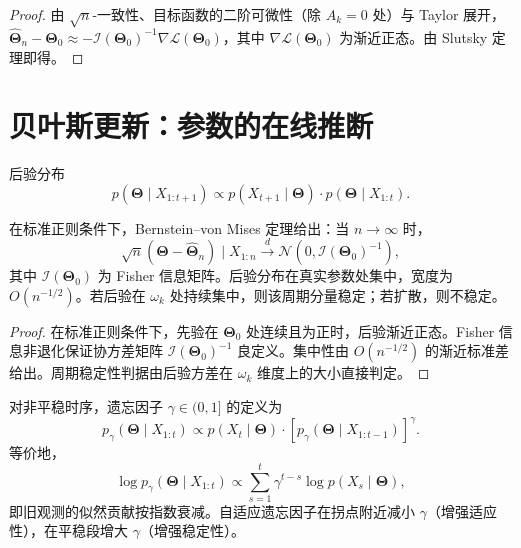 \begin{proof}
由 $\sqrt{n}$-一致性、目标函数的二阶可微性（除 $A_k=0$ 处）与 Taylor 展开，$\hat{\boldsymbol{\Theta}}_n-\boldsymbol{\Theta}_0\approx-\mathcal{I}(\boldsymbol{\Theta}_0)^{-1}\nabla\mathcal{L}(\boldsymbol{\Theta}_0)$，其中 $\nabla\mathcal{L}(\boldsymbol{\Theta}_0)$ 为渐近正态。由 Slutsky 定理即得。
\end{proof}

\section{贝叶斯更新：参数的在线推断}

\begin{definition}[有限谐波参数的贝叶斯更新]\label{def:ts_bayesian_update}
后验分布
\[
p(\boldsymbol{\Theta} \mid X_{1:t+1}) \propto p(X_{t+1} \mid \boldsymbol{\Theta}) \cdot p(\boldsymbol{\Theta} \mid X_{1:t}).
\]
\end{definition}

\begin{proposition}[后验收敛性与周期稳定性]\label{prop:ts_bayes_convergence}
在标准正则条件下，Bernstein--von Mises 定理给出：当 $n \to \infty$ 时，
\[
\sqrt{n}(\boldsymbol{\Theta} - \hat{\boldsymbol{\Theta}}_n) \mid X_{1:n} \xrightarrow{d} \mathcal{N}(0, \mathcal{I}(\boldsymbol{\Theta}_0)^{-1}),
\]
其中 $\mathcal{I}(\boldsymbol{\Theta}_0)$ 为 Fisher 信息矩阵。后验分布在真实参数处集中，宽度为 $O(n^{-1/2})$。若后验在 $\omega_k$ 处持续集中，则该周期分量稳定；若扩散，则不稳定。
\end{proposition}

\begin{proof}
在标准正则条件下，先验在 $\boldsymbol{\Theta}_0$ 处连续且为正时，后验渐近正态。Fisher 信息非退化保证协方差矩阵 $\mathcal{I}(\boldsymbol{\Theta}_0)^{-1}$ 良定义。集中性由 $O(n^{-1/2})$ 的渐近标准差给出。周期稳定性判据由后验方差在 $\omega_k$ 维度上的大小直接判定。
\end{proof}

\begin{proposition}[遗忘因子的自适应]\label{prop:ts_forgetting}
对非平稳时序，遗忘因子 $\gamma \in (0,1]$ 的定义为
\[
p_\gamma(\boldsymbol{\Theta} \mid X_{1:t}) \propto p(X_t \mid \boldsymbol{\Theta}) \cdot [p_\gamma(\boldsymbol{\Theta} \mid X_{1:t-1})]^\gamma.
\]
等价地，
\[
\log p_\gamma(\boldsymbol{\Theta} \mid X_{1:t}) \propto \sum_{s=1}^t \gamma^{t-s} \log p(X_s \mid \boldsymbol{\Theta}),
\]
即旧观测的似然贡献按指数衰减。自适应遗忘因子在拐点附近减小 $\gamma$（增强适应性），在平稳段增大 $\gamma$（增强稳定性）。
\end{proposition}

